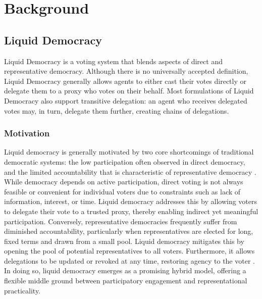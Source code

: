\graphicspath{{../figures/}}

\chapter{Background}
\label{chap:background}

\section{Liquid Democracy}

Liquid Democracy is a voting system that blends aspects of direct and representative democracy. Although there is no universally accepted definition, Liquid Democracy generally allows agents to either cast their votes directly or delegate them to a proxy who votes on their behalf. Most formulations of Liquid Democracy also support transitive delegation: an agent who receives delegated votes may, in turn, delegate them further, creating chains of delegations. \cite{degraveResolvingMultiproxyTransitive2014, boldiViscousDemocracySocial2011, revel2022liquid, bersetcheGeneralizingLiquidDemocracy2022}

\subsection{Motivation}

Liquid democracy is generally motivated by two core shortcomings of traditional democratic systems: the low participation often observed in direct democracy, and the limited accountability that is characteristic of representative democracy \cite{fordDelegativeDemocracy2002, brillInteractiveDemocracy2018}. While democracy depends on active participation, direct voting is not always feasible or convenient for individual voters due to constraints such as lack of information, interest, or time. Liquid democracy addresses this by allowing voters to delegate their vote to a trusted proxy, thereby enabling indirect yet meaningful participation. Conversely, representative democracies frequently suffer from diminished accountability, particularly when representatives are elected for long, fixed terms and drawn from a small pool. Liquid democracy mitigates this by opening the pool of potential representatives to all voters. Furthermore, it allows delegations to be updated or revoked at any time, restoring agency to the voter \cite{brillInteractiveDemocracy2018}. In doing so, liquid democracy emerges as a promising hybrid model, offering a flexible middle ground between participatory engagement and representational practicality.

